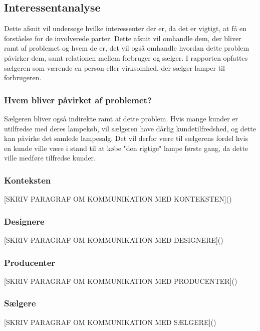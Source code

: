 \subsection{Interessentanalyse}
Dette afsnit vil undersøge hvilke interessenter der er, da det er vigtigt, at få en forståelse for de involverede parter. Dette afsnit vil omhandle dem, der bliver ramt af problemet og hvem de er, det vil også omhandle hvordan dette problem påvirker dem, samt relationen mellem forbruger og sælger. I rapporten opfattes sælgeren som værende en person eller virksomhed, der sælger lamper til forbrugeren. 

\subsubsection{Hvem bliver påvirket af problemet?}


Sælgeren bliver også indirekte ramt af dette problem. Hvis mange kunder er utilfredse med deres lampekøb, vil sælgeren have dårlig kundetilfredshed, og dette kan påvirke det samlede lampesalg. Det vil derfor være til sælgerens fordel hvis en kunde ville være i stand til at købe "den rigtige" lampe første gang, da dette ville medføre tilfredse kunder.


\subsubsection{Konteksten}
[SKRIV PARAGRAF OM KOMMUNIKATION MED KONTEKSTEN]()
\subsubsection{Designere}
[SKRIV PARAGRAF OM KOMMUNIKATION MED DESIGNERE]()
\subsubsection{Producenter}
[SKRIV PARAGRAF OM KOMMUNIKATION MED PRODUCENTER]()
\subsubsection{Sælgere}
[SKRIV PARAGRAF OM KOMMUNIKATION MED SÆLGERE]()
